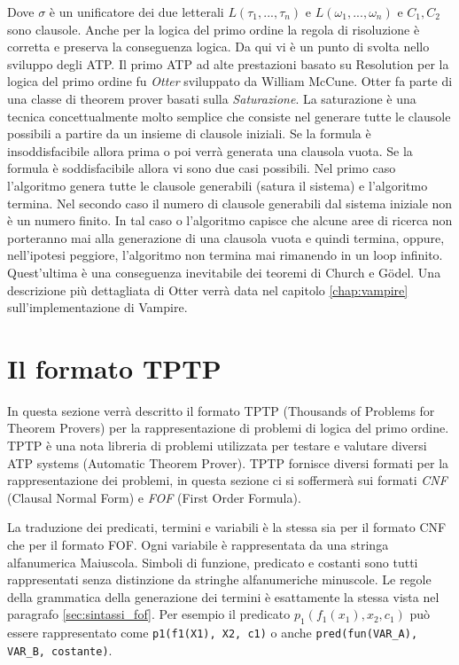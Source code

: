 \documentclass[./main.tex]{subfiles}
\begin{document}
Dove $\sigma$ è un unificatore dei due letterali $L(\tau_1, ..., \tau_n)$ e $L(\omega_1, ..., \omega_n)$ e $C_1, C_2$ sono clausole.
Anche per la logica del primo ordine la regola di risoluzione è corretta e preserva la conseguenza logica.
Da qui vi è un punto di svolta nello sviluppo degli ATP.
Il primo ATP ad alte prestazioni basato su Resolution per la logica del primo ordine fu \textit{Otter} sviluppato da William McCune.
Otter fa parte di una classe di theorem prover basati sulla \textit{Saturazione}.
La saturazione è una tecnica concettualmente molto semplice che consiste nel generare 
tutte le clausole possibili a partire da un insieme di clausole iniziali.
Se la formula è insoddisfacibile allora prima o poi verrà generata una clausola vuota.
Se la formula è soddisfacibile allora vi sono due casi possibili.
Nel primo caso l'algoritmo genera tutte le clausole generabili (satura il sistema) e l'algoritmo termina.
Nel secondo caso il numero di clausole generabili dal sistema iniziale non è un numero finito.
In tal caso o l'algoritmo capisce che alcune aree di ricerca non porteranno mai alla generazione 
di una clausola vuota e quindi termina,
oppure, nell'ipotesi peggiore, l'algoritmo non termina mai rimanendo in un loop infinito.
Quest'ultima è una conseguenza inevitabile dei teoremi di Church e Gödel.
Una descrizione più dettagliata di Otter verrà data nel capitolo \ref{chap:vampire} sull'implementazione di Vampire.




\section{Il formato TPTP}
In questa sezione verrà descritto il formato TPTP (Thousands of Problems for Theorem Provers) 
per la rappresentazione di problemi di logica del primo ordine.
TPTP è una nota libreria di problemi utilizzata per testare e valutare diversi ATP systems (Automatic Theorem Prover).
TPTP fornisce diversi formati per la rappresentazione dei problemi,
in questa sezione ci si soffermerà sui formati \textit{CNF} (Clausal Normal Form) e \textit{FOF} (First Order Formula).


La traduzione dei predicati, termini e variabili è la stessa sia per il formato CNF che per il formato FOF.
Ogni variabile è rappresentata da una stringa alfanumerica Maiuscola. 
Simboli di funzione, predicato e costanti sono tutti rappresentati senza distinzione da stringhe alfanumeriche minuscole.
Le regole della grammatica della generazione dei termini è esattamente la stessa vista nel paragrafo \ref{sec:sintassi_fof}.
Per esempio il predicato $p_1(f_1(x_1), x_2, c_1)$ 
può essere rappresentato come \texttt{p1(f1(X1), X2, c1)} o anche \texttt{pred(fun(VAR\_A), VAR\_B, costante)}.
\end{document}
